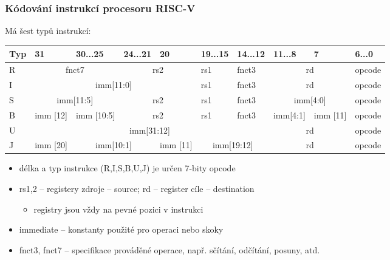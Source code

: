 \documentclass{beamer}
\begin{document}
\begin{frame}
\frametitle{Kódování instrukcí procesoru RISC-V}

Má šest typů instrukcí:
\begin{table}
\footnotesize
\begin{tabular}{|m{0.4cm}|m{0.4cm}|m{1.0cm}|m{1.0cm}|m{0.4cm}|m{1.0cm}|m{1.0cm}|m{1.0cm}|m{0.4cm}|m{1.0cm}|}\hline
Typ & 31 & 30...25 & 24...21 & 20 & 19...15 & 14...12 & 11...8 & 7 & 6...0 \\ \hline
R & \multicolumn{2}{c|}{ fnct7 } & \multicolumn{2}{c|}{ rs2 } & rs1 & fnct3 &\multicolumn{2}{c|}{ rd } & opcode\\ \hline
I & \multicolumn{4}{c|}{ imm[11:0] } & rs1 & fnct3 &\multicolumn{2}{c|}{ rd } & opcode\\ \hline
S & \multicolumn{2}{c|}{ imm[11:5] } & \multicolumn{2}{c|}{ rs2 } & rs1 & fnct3 &\multicolumn{2}{c|}{ imm[4:0] } & opcode\\ \hline
B & imm [12] & imm [10:5]  & \multicolumn{2}{c|}{ rs2 } & rs1 & fnct3 & imm[4:1]& imm [11] & opcode\\ \hline
U & \multicolumn{6}{c|}{ imm[31:12] }  & \multicolumn{2}{c|}{ rd } & opcode\\ \hline
J & imm [20] & \multicolumn{2}{c|}{ imm[10:1] } & imm [11] & \multicolumn{2}{c|}{ imm[19:12] } & \multicolumn{2}{c|}{ rd } & opcode\\ \hline
\end{tabular}
\end{table}

\begin{itemize}
\item délka a typ instrukce (R,I,S,B,U,J) je určen 7-bity opcode
\item rs1,2 -- registery zdroje -- source; rd -- register cíle -- destination
\begin{itemize}
\item registry jsou vždy na pevné pozici v instrukci
\end{itemize}
\item immediate -- konstanty použité pro operaci nebo skoky
\item fnct3, fnct7 -- specifikace prováděné operace, např. sčítání, odčítání, posuny, atd.
\end{itemize}

\end{frame}
\end{document}
